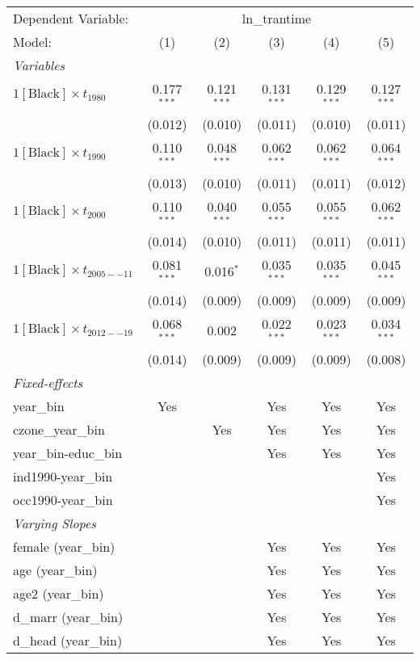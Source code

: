 \begin{tabular}{lccccc}
\tabularnewline\midrule\midrule
Dependent Variable:&\multicolumn{5}{c}{ln\_trantime}\\
Model:&(1) & (2) & (3) & (4) & (5)\\
\midrule \emph{Variables}&   &   &   &   &  \\
$1[\text{Black}] \times t_{1980}$ & 0.177$^{***}$ & 0.121$^{***}$ & 0.131$^{***}$ & 0.129$^{***}$ & 0.127$^{***}$\\
  &(0.012) & (0.010) & (0.011) & (0.010) & (0.011)\\
$1[\text{Black}] \times t_{1990}$ & 0.110$^{***}$ & 0.048$^{***}$ & 0.062$^{***}$ & 0.062$^{***}$ & 0.064$^{***}$\\
  &(0.013) & (0.010) & (0.011) & (0.011) & (0.012)\\
$1[\text{Black}] \times t_{2000}$ & 0.110$^{***}$ & 0.040$^{***}$ & 0.055$^{***}$ & 0.055$^{***}$ & 0.062$^{***}$\\
  &(0.014) & (0.010) & (0.011) & (0.011) & (0.011)\\
$1[\text{Black}] \times t_{2005--11}$ & 0.081$^{***}$ & 0.016$^{*}$ & 0.035$^{***}$ & 0.035$^{***}$ & 0.045$^{***}$\\
  &(0.014) & (0.009) & (0.009) & (0.009) & (0.009)\\
$1[\text{Black}] \times t_{2012--19}$ & 0.068$^{***}$ & 0.002 & 0.022$^{***}$ & 0.023$^{***}$ & 0.034$^{***}$\\
  &(0.014) & (0.009) & (0.009) & (0.009) & (0.008)\\
\midrule \emph{Fixed-effects}&   &   &   &   &  \\
year\_bin & Yes &  & Yes & Yes & Yes\\
czone\_year\_bin &  & Yes & Yes & Yes & Yes\\
year\_bin-educ\_bin &  &  & Yes & Yes & Yes\\
ind1990-year\_bin &  &  &  &  & Yes\\
occ1990-year\_bin &  &  &  &  & Yes\\
\midrule \emph{Varying Slopes}&   &   &   &   &  \\
female (year\_bin) &  &  & Yes & Yes & Yes\\
age (year\_bin) &  &  & Yes & Yes & Yes\\
age2 (year\_bin) &  &  & Yes & Yes & Yes\\
d\_marr (year\_bin) &  &  & Yes & Yes & Yes\\
d\_head (year\_bin) &  &  & Yes & Yes & Yes\\

\end{tabular}
